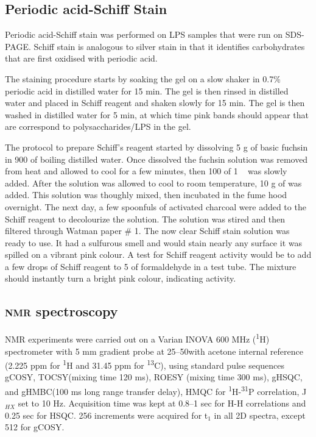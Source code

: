     \subsection{Periodic acid-Schiff Stain} %
    \label{sub:schiff_stain}
		
    Periodic   acid-Schiff   stain   was   performed   on  \ac{LPS}   samples   that   were   run   on
    \ac{SDS-PAGE}. Schiff stain is analogous to silver  stain in that it identifies carbohydrates that
    are first oxidised with periodic acid.

    The staining procedure starts by soaking the gel on a slow shaker in 0.7\% periodic acid in
    distilled water for 15 min. The gel is then rinsed in distilled water and placed in Schiff reagent
    and shaken slowly for 15 min. The gel is then washed in distilled water for 5 min, at which time
    pink bands should appear that are correspond to polysaccharides/\ac{LPS} in the gel.

    The protocol to prepare Schiff's reagent started by dissolving 5 \si{\gram} of basic fuchsin in
    900 \millilitre of boiling distilled water. Once dissolved the fuchsin solution was removed from
    heat and allowed to cool for a few minutes, then 100 \millilitre of 1 \si{\molar}\  was
    slowly added. After the solution was allowed to cool to room temperature, 10 \si{\gram} of
     was added. This solution was thoughly mixed, then incubated in the fume hood
    overnight. The next day, a few spoonfuls of activated charcoal were added to the Schiff reagent to
    decolourize the solution. The solution was stired and then filtered through Watman paper \# 1. The
    now clear Schiff stain solution was ready to use. It had a sulfurous smell and would stain nearly
    any surface it was spilled on a vibrant pink colour. A test for Schiff reagent activity would be
    to add a few drops of Schiff reagent to 5 \millilitre of formaldehyde in a test tube. The mixture
    should instantly turn a bright pink colour, indicating activity.

      \subsection{\textsc{nmr} spectroscopy} %
      \label{sub:nmr_spectroscopy}

      \ac{NMR} experiments were carried out on a Varian INOVA 600 \si{\mega\hertz}
      (\textsuperscript{1}H) spectrometer with 5 \si{\milli\meter} gradient probe at 25--50\cel with
      acetone internal reference (2.225 ppm for \textsuperscript{1}H and 31.45 ppm for
      \textsuperscript{13}C), using standard pulse sequences \ac{gCOSY}, \ac{TOCSY}(mixing time 120
      \si{\milli\second}), \ac{ROESY} (mixing time 300 \si{\milli\second}), \ac{gHSQC}, and
      \ac{gHMBC}(100 \si{\milli\second} long range transfer delay), \ac{HMQC} for
      \textsuperscript{1}H-\textsuperscript{31}P correlation, J$_{HX}$ set to 10
      \si{\hertz}. Acquisition time was kept at 0.8--1 sec for H-H correlations and 0.25 sec for
      \ac{HSQC}. 256 increments were acquired for t$_1$ in all 2D spectra, except 512 for \ac{gCOSY}.

